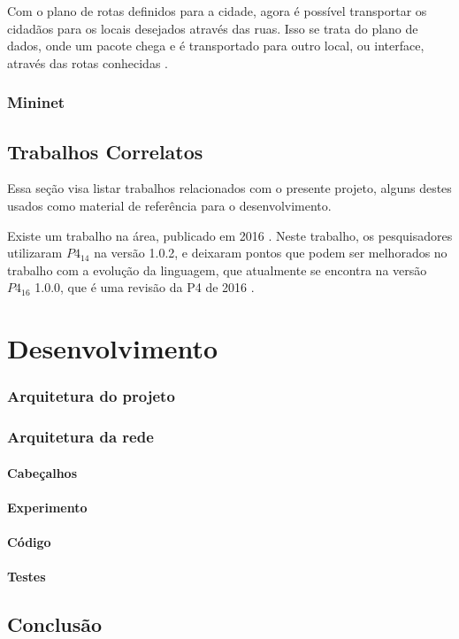 \documentclass[12pt,
openright, 
oneside,
a4paper,
brazil]{facom-ufu-abntex2}
\theoremstyle{definition}
\begin{document}
Com o plano de rotas definidos para a cidade, agora é possível transportar os cidadãos
para os locais desejados através das ruas. Isso se trata do plano de dados, onde 
um pacote chega e é transportado para outro local, ou interface, através das rotas 
conhecidas \citep{dataVsControl}.

\subsection{Mininet}


\section{Trabalhos Correlatos}
Essa seção visa listar trabalhos relacionados com o presente projeto, alguns destes usados
como material de referência para o desenvolvimento.

Existe um trabalho na área, publicado em 2016 \citep{dang2016paxos}. Neste trabalho,
os pesquisadores utilizaram $P4_{14}$ na versão 1.0.2, e deixaram pontos que podem ser
melhorados no trabalho com a evolução da linguagem, que atualmente se encontra na versão
$P4_{16}$ 1.0.0, que é uma revisão da P4 de 2016 \citep{paxos16spec}.


\chapter{Desenvolvimento}
 
\subsection{Arquitetura do projeto}
\subsection{Arquitetura da rede}
\subsubsection{Cabeçalhos}
\subsubsection{Experimento}
\subsubsection{Código}
\subsubsection{Testes}

\section{Conclusão}





\end{document}
